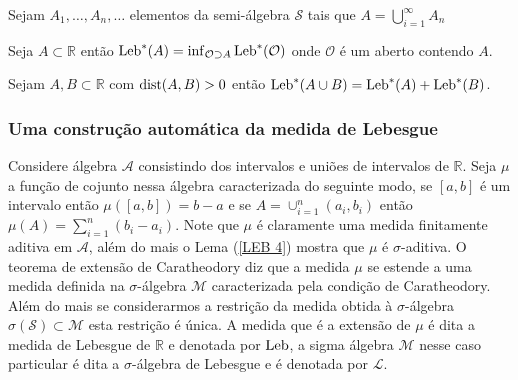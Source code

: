 
\begin{proposicao}
Sejam $A_1, \ldots, A_n, \ldots$ elementos da semi-álgebra 
$\mathcal{S}$ tais que $A=\bigcup_{i=1}^{\infty}A_n$


\end{proposicao}




\begin{proposicao}
Seja $A\subset \mathbb{R}$ então 
$ 
\textnormal{Leb}^{*}(A)
=
\inf_{\mathcal{O}\supset A}\textnormal{Leb}^{*}(\mathcal{O})
$ 
onde $\mathcal{O}$ é um aberto contendo $A$.
\end{proposicao}


\begin{proposicao}
Sejam $A,B\subset \mathbb{R}$ com $\textnormal{dist}(A,B)>0$ 
então 
$
\textnormal{Leb}^{*}(A\cup B)
=
\textnormal{Leb}^{*}(A)+\textnormal{Leb}^{*}(B)
$.
\end{proposicao}



\subsubsection{Uma construç\~ao autom\'atica da medida de Lebesgue}


Considere álgebra $\mathcal{A}$ consistindo dos 
intervalos e uniões de intervalos de   $\mathbb{R}.$ 
Seja  $\mu$ a  função de cojunto  nessa álgebra 
caracterizada do seguinte modo, se $[a,b]$ é um 
intervalo  então $\mu([a,b])=b-a$ 
e se $A=\cup_{i=1}^n(a_i,b_i)$ então 
$\mu(A)=\sum_{i=1}^n(b_i-a_i).$  
Note que $\mu$ é claramente uma medida 
finitamente aditiva em $\mathcal{A}$, 
além do mais o Lema (\ref{LEB 4}) mostra 
que $\mu$ é $\sigma$-aditiva. 
O teorema de extensão de Caratheodory diz que a 
medida $\mu$ se estende a uma medida definida na 
$\sigma$-álgebra  $\mathcal{M}$  
caracterizada pela condição de Caratheodory. 
Além do mais se considerarmos a restrição 
da medida obtida  à $\sigma$-álgebra
$\sigma(\mathcal{S})\subset \mathcal{M}$ 
esta restrição é única. A medida que é a 
extensão de $\mu$ é dita a medida de Lebesgue 
de $\mathbb{R}$ e denotada por $\textnormal{Leb}$, 
a sigma álgebra $\mathcal{M}$ nesse caso particular
é dita a $\sigma$-álgebra de Lebesgue e é denotada por $\mathcal{L}$.






































